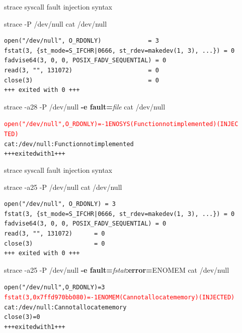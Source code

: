 \documentclass[unicode]{beamer}
\begin{document}
\begin{frame}[fragile]{strace syscall fault injection syntax}
\scriptsize
\begin{block}{\large strace -P /dev/null cat /dev/null}
\begin{verbatim}
open("/dev/null", O_RDONLY)             = 3
fstat(3, {st_mode=S_IFCHR|0666, st_rdev=makedev(1, 3), ...}) = 0
fadvise64(3, 0, 0, POSIX_FADV_SEQUENTIAL) = 0
read(3, "", 131072)                     = 0
close(3)                                = 0
+++ exited with 0 +++
\end{verbatim}
\end{block}
\begin{block}{\large strace -a28 -P /dev/null {\bf -e fault=}{\it file} cat /dev/null}
\begin{alltt}
\textcolor{red}{open("/dev/null", O_RDONLY) = -1 ENOSYS (Function not implemented) (INJEC
TED)}
cat: /dev/null: Function not implemented
+++ exited with 1 +++
\end{alltt}
\end{block}
\end{frame}

\begin{frame}[fragile]{strace syscall fault injection syntax}
\scriptsize
\begin{block}{\large strace -a25 -P /dev/null cat /dev/null}
\begin{verbatim}
open("/dev/null", O_RDONLY) = 3
fstat(3, {st_mode=S_IFCHR|0666, st_rdev=makedev(1, 3), ...}) = 0
fadvise64(3, 0, 0, POSIX_FADV_SEQUENTIAL) = 0
read(3, "", 131072)      = 0
close(3)                 = 0
+++ exited with 0 +++
\end{verbatim}
\end{block}
\begin{block}{\large strace -a25 -P /dev/null {\bf -e fault=}{\it fstat}{\bf :error=}{\sc ENOMEM} cat /dev/null}
\begin{alltt}
open("/dev/null", O_RDONLY) = 3
\textcolor{red}{fstat(3, 0x7ffd970bb080) = -1 ENOMEM (Cannot allocate memory) (INJECTED)}
cat: /dev/null: Cannot allocate memory
close(3)                 = 0
+++ exited with 1 +++
\end{alltt}
\end{block}
\end{frame}
\end{document}
